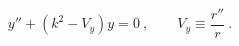 \begin{equation}
 y''+ \left( k^2 - {V}_y\right) y= 0~,
 \qquad
 {V}_y \equiv \frac{r''}{r}~.
 \label{e:y-eqn2}
\end{equation}

